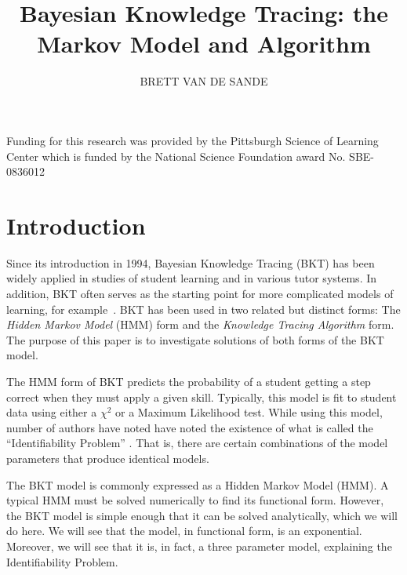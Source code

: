 \documentclass{acmlarge-edm}
\title{Bayesian Knowledge Tracing:  the Markov Model and Algorithm}
\author{BRETT VAN DE SANDE
\affil{Arizona State University\\bvds@asu.edu}}
\begin{document}


\begin{bottomstuff}
Funding for this research was provided by the Pittsburgh Science of
Learning Center which is funded by the National Science Foundation
award No. SBE-0836012
\end{bottomstuff}

\maketitle

%
%


\section{Introduction}

Since its introduction in 1994, Bayesian Knowledge Tracing (BKT) 
\cite{corbett_knowledge_1994} has been widely applied
in studies of student learning and in various tutor systems.  
In addition, BKT often serves as the starting
%
%
point for more complicated models of learning, for 
example~\cite{baker_r._improving_2008,lee_impact_2012}.
BKT has been used in two related but distinct forms:  The {\em Hidden Markov Model}
(HMM) form and the {\em Knowledge Tracing Algorithm} form.
The purpose of this paper is to investigate solutions of both
forms of the BKT model.

The HMM form of BKT predicts the probability of a student 
getting a step correct when they must apply a given skill.
Typically, this model is fit to student data using either
a $\chi^2$ or a Maximum Likelihood test.
While using this model,  number of authors have noted have noted the 
existence of what is called the ``Identifiability Problem'' 
\cite{beck_identifiability:_2007}.    
That is, there are certain combinations of the model 
parameters that produce identical models.   

The BKT model is commonly expressed as a Hidden Markov Model (HMM).
A typical HMM must be solved numerically to find its functional form.
However, the BKT model is simple enough that it can be solved analytically,
which we will do here.  We will see that the model, in functional
form, is an exponential.  Moreover, we will see that it is, in fact,
a three parameter model, explaining the Identifiability Problem.
\end{document}
